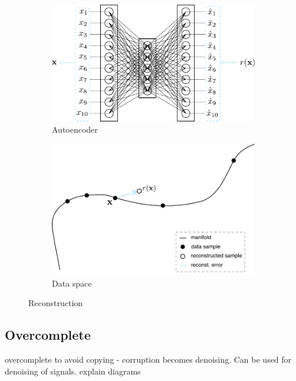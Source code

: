 \begin{figure}[!h]
\centering
\begin{subfigure}{.5\textwidth}
  \centering
  \includegraphics[width=.75\linewidth]{figures/autoencoder-undercomplete}
  \caption{Autoencoder}
  \label{fig:ae}
\end{subfigure}%
\begin{subfigure}{.5\textwidth}
  \centering
  \includegraphics[width=.75\linewidth]{figures/reconstruction}
  \caption{Data space}
  \label{fig:ae-process}
\end{subfigure}
\caption{Reconstruction}
\label{fig:test}
\end{figure}

\subsection{Overcomplete}

overcomplete to avoid copying - corruption becomes denoising. Can be used for denoising of signals. explain diagrams

